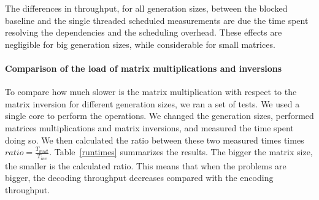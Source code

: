 The differences in throughput, for all generation sizes, between the blocked
baseline and the single threaded scheduled measurements are due the time spent
resolving the dependencies and the scheduling overhead. These effects are
negligible for big generation sizes, while considerable for small matrices.

%
%



\paragraph{Comparison of the load of matrix multiplications and inversions}

To compare how much slower is the matrix multiplication with respect to the
matrix inversion for different generation sizes, we ran a set of tests. We used
a single core to perform the operations. We changed the generation sizes,
performed matrices multiplications and matrix inversions, and measured the time
spent doing so. We then calculated the ratio between these two measured times
times $ratio = \frac{T_{mult}}{T_{inv}}$. Table~\ref{runtimes} summarizes the
results. The bigger the matrix size, the smaller is the calculated ratio. This
means that when the problems are bigger, the decoding throughput decreases
compared with the encoding throughput.

